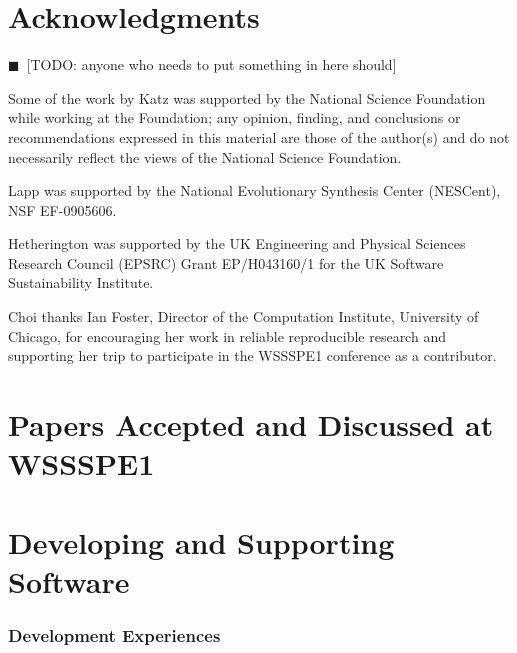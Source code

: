 \documentclass[11pt, oneside]{amsart}
\newcommand{\todo}[1]{{\color{blue}$\blacksquare$~\textsf{[TODO: #1]}}}
\begin{document}
\section*{Acknowledgments}

\todo{anyone who needs to put something in here should}

Some of the work by Katz was
supported by the National Science Foundation while working at the
Foundation; any opinion, finding, and conclusions or recommendations
expressed in this material are those of the author(s) and do not
necessarily reflect the views of the National Science Foundation.

Lapp was supported by the National Evolutionary Synthesis Center (NESCent),
NSF EF-0905606.

Hetherington was supported by the UK Engineering and
Physical Sciences Research Council (EPSRC) Grant EP/H043160/1 for the
UK Software Sustainability Institute.


Choi thanks Ian Foster, Director of the Computation Institute, University of Chicago,
for encouraging her work in reliable reproducible research and
supporting her trip to participate in the WSSSPE1 conference as a contributor.


\appendix
\section{Papers Accepted and Discussed at WSSSPE1} \label{sec:papers}

\section*{Developing and Supporting Software}

\subsubsection*{Development Experiences}
\end{document}
